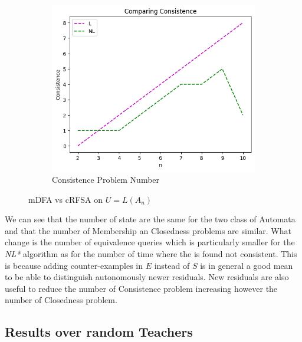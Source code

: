 \begin{figure}[!htb]
\begin{subfigure}[b]{0.3\textwidth}
    \label{fig:ClosednessWrostRFSACompare}
  \end{subfigure}
  \begin{subfigure}[b]{0.3\textwidth}
    \includegraphics[width=\textwidth]{../statistics/plots/wrostRFSA/Consistence.png}
    \caption{Consistence Problem Number}
    \label{fig:ConsistenceWrostRFSACompare}
  \end{subfigure}
  \caption{mDFA vs cRFSA on $U = L(A_n)$}
  \label{fig:wrostRFSA}
\end{figure}

We can see that the number of state are the same for the two class of Automata and that the number of Membership an Closedness problems are similar. What change is the number of equivalence queries which is particularly smaller for the \textit{NL*} algorithm as for the number of time where the \OT is found not consistent. This is because adding counter-examples in $E$ instead of $S$ is in general a good mean to be able to distinguish autonomously newer residuals. New residuals are also useful to reduce the number of Consistence problem increasing however the number of Closedness problem.

\subsection{Results over random Teachers}

